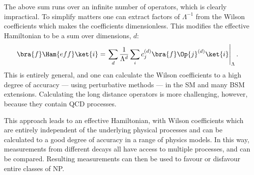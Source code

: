 The above sum runs over an infinite number of operators, which is clearly impractical.
To simplify matters one can extract factors of $\Lambda^{-1}$ from the Wilson coefficients which
makes the coefficients dimensionless.
This modifies the effective Hamiltonian to be a sum over dimensions, $d$:
\begin{equation}
  \bra{f}\Ham{eff}\ket{i} =
  \left.\sum_{d}\frac{1}{\Lambda^{d}}
  \sum_i c_j^{(d)}\bra{f}\Op{j}^{(d)}\ket{i}\right|_{\Lambda}.
\end{equation}
This is entirely general, and one can calculate the Wilson coefficients to a high degree of
accuracy --- using perturbative methods --- in the SM and many BSM extensions.
Calculating the long distance operators is more challenging, however, because they contain QCD
processes.

This approach leads to an effective Hamiltonian, with Wilson coefficients which are entirely
independent of the underlying physical processes and can be calculated to a good degree of accuracy
in a range of physics models.
In this way, measurements from different decays all have access to multiple processes, and can be
compared.
Resulting measurements can then be used to favour or disfavour entire classes of NP.






